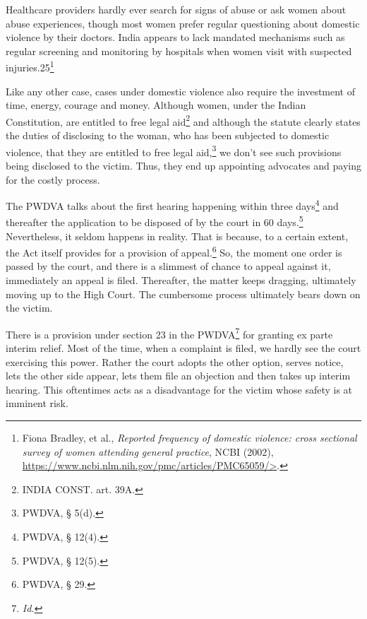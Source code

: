 \begin{multicols}{2}
\noi
Healthcare providers hardly ever search for signs of abuse or ask women about abuse
experiences, though most women prefer regular questioning about domestic violence by their
doctors. India appears to lack mandated mechanisms such as regular screening and
monitoring by hospitals when women visit with suspected injuries.25\footnote{Fiona Bradley, et al., \textit{Reported frequency of domestic violence: cross sectional survey of women attending
general practice}, NCBI (2002), \url{https://www.ncbi.nlm.nih.gov/pmc/articles/PMC65059/>}.}


\noi
Like any other case, cases under domestic violence also require the investment of time,
energy, courage and money. Although women, under the Indian Constitution, are entitled to
free legal aid\footnote{INDIA CONST. art. 39A. } and although the statute clearly states the duties of disclosing to the woman, who has been subjected to domestic violence, that they are entitled to free legal aid,\footnote{ PWDVA, § 5(d).} we
don’t see such provisions being disclosed to the victim. Thus, they end up appointing
advocates and paying for the costly process. 

\noi
The PWDVA talks about the first hearing happening within three days\footnote{PWDVA, § 12(4).} and thereafter the
application to be disposed of by the court in 60 days.\footnote{PWDVA, § 12(5).} Nevertheless, it seldom happens in
reality. That is because, to a certain extent, the Act itself provides for a provision of appeal.\footnote{PWDVA, § 29.}
So, the moment one order is passed by the court, and there is a slimmest of chance to appeal
against it, immediately an appeal is filed. Thereafter, the matter keeps dragging, ultimately
moving up to the High Court. The cumbersome process ultimately bears down on the victim.

\noi
There is a provision under section 23 in the PWDVA\footnote{\textit{Id.}} for granting ex parte interim relief.
Most of the time, when a complaint is filed, we hardly see the court exercising this power.
Rather the court adopts the other option, serves notice, lets the other side appear, lets them
file an objection and then takes up interim hearing. This oftentimes acts as a disadvantage for
the victim whose safety is at imminent risk. 


\end{multicols}
